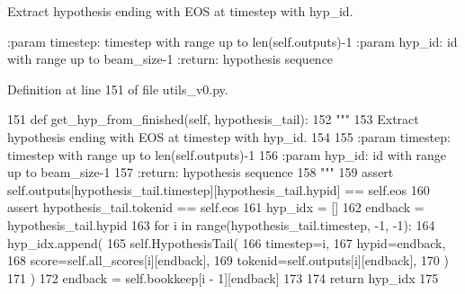 \begin{DoxyVerb}Extract hypothesis ending with EOS at timestep with hyp_id.

:param timestep: timestep with range up to len(self.outputs)-1
:param hyp_id: id with range up to beam_size-1
:return: hypothesis sequence
\end{DoxyVerb}
 

Definition at line 151 of file utils\+\_\+v0.\+py.


\begin{DoxyCode}
151     \textcolor{keyword}{def }get\_hyp\_from\_finished(self, hypothesis\_tail):
152         \textcolor{stringliteral}{"""}
153 \textcolor{stringliteral}{        Extract hypothesis ending with EOS at timestep with hyp\_id.}
154 \textcolor{stringliteral}{}
155 \textcolor{stringliteral}{        :param timestep: timestep with range up to len(self.outputs)-1}
156 \textcolor{stringliteral}{        :param hyp\_id: id with range up to beam\_size-1}
157 \textcolor{stringliteral}{        :return: hypothesis sequence}
158 \textcolor{stringliteral}{        """}
159         \textcolor{keyword}{assert} self.outputs[hypothesis\_tail.timestep][hypothesis\_tail.hypid] == self.eos
160         \textcolor{keyword}{assert} hypothesis\_tail.tokenid == self.eos
161         hyp\_idx = []
162         endback = hypothesis\_tail.hypid
163         \textcolor{keywordflow}{for} i \textcolor{keywordflow}{in} range(hypothesis\_tail.timestep, -1, -1):
164             hyp\_idx.append(
165                 self.HypothesisTail(
166                     timestep=i,
167                     hypid=endback,
168                     score=self.all\_scores[i][endback],
169                     tokenid=self.outputs[i][endback],
170                 )
171             )
172             endback = self.bookkeep[i - 1][endback]
173 
174         \textcolor{keywordflow}{return} hyp\_idx
175 
\end{DoxyCode}
\mbox{\label{classparlai_1_1agents_1_1legacy__agents_1_1seq2seq_1_1utils__v0_1_1Beam_a76fadcbf18352eb7f2d741e9b04e0a6a}} 
